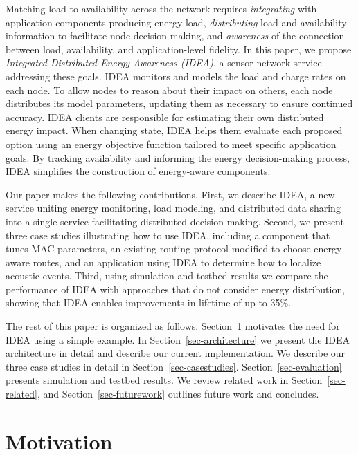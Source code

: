 \documentclass{sig-alternate}
\begin{document}
Matching load to availability across the network requires
\textit{integrating} with application components producing energy load,
\textit{distributing} load and availability information to facilitate node
decision making, and \textit{awareness} of the connection between load,
availability, and application-level fidelity. In this paper, we propose
\textit{Integrated Distributed Energy Awareness (IDEA)}, a sensor network
service addressing these goals. IDEA monitors and models the load and charge
rates on each node. To allow nodes to reason about their impact on others,
each node distributes its model parameters, updating them as necessary to
ensure continued accuracy. IDEA clients are responsible for estimating their
own distributed energy impact. When changing state, IDEA helps them evaluate
each proposed option using an energy objective function tailored to meet
specific application goals. By tracking availability and informing the energy
decision-making process, IDEA simplifies the construction of energy-aware
components.

Our paper makes the following contributions. First, we describe IDEA, a new
service uniting energy monitoring, load modeling, and distributed data
sharing into a single service facilitating distributed decision making.
Second, we present three case studies illustrating how to use IDEA, including
a component that tunes MAC parameters, an existing routing protocol modified
to choose energy-aware routes, and an application using IDEA to determine how
to localize acoustic events. Third, using simulation and testbed results we
compare the performance of IDEA with approaches that do not consider energy
distribution, showing that IDEA enables improvements in lifetime of up to
35\%.

The rest of this paper is organized as follows. Section~\ref{sec-motivation}
motivates the need for IDEA using a simple example. In
Section~\ref{sec-architecture} we present the IDEA architecture in detail and
describe our current implementation. We describe our three case studies in
detail in Section~\ref{sec-casestudies}. Section~\ref{sec-evaluation}
presents simulation and testbed results. We review related work in
Section~\ref{sec-related}, and Section~\ref{sec-futurework} outlines future
work and concludes.

\section{Motivation}
\label{sec-motivation}
\end{document}
